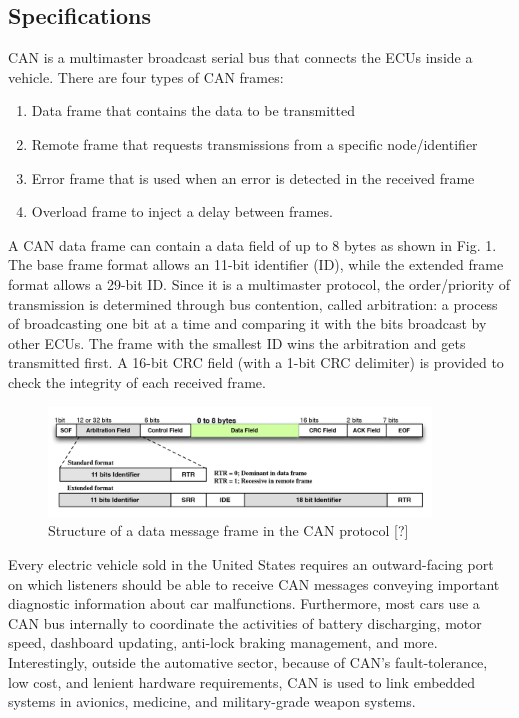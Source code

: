 \documentclass{article}
\begin{document}
  \subsection{Specifications}
    CAN  is  a  multimaster  broadcast  serial  bus  that  connects the  ECUs  inside  a  vehicle.   There  are  four  types  of  CAN frames:
  \begin{enumerate}
    \item Data frame that contains the data to be transmitted
    \item Remote frame that requests transmissions from a specific node/identifier
    \item Error frame that is used when an error is detected in the received frame
    \item Overload frame to inject a delay  between  frames.   
  \end{enumerate} 
    A  CAN  data  frame  can  contain  a data  field  of  up  to  8  bytes  as  shown  in    Fig.  1.   The  base frame format allows an 11-bit identifier (ID), while the extended frame format allows a 29-bit ID. Since it is a multimaster protocol, the order/priority of transmission is determined through bus contention, called arbitration:  a process of broadcasting one bit at a time and comparing it with the bits broadcast by other ECUs.  The frame with the smallest ID wins the arbitration and gets transmitted first.  A 16-bit CRC field (with a 1-bit CRC delimiter) is provided to check the integrity of each received frame.\\
    
\begin{figure}[h]
  \centering
  \includegraphics[width=4in]{frame}
  \caption {Structure of a data message frame in the CAN protocol [?]}
\end{figure}
    
    Every electric vehicle sold in the United States requires an outward-facing port on which listeners should be able to receive CAN messages conveying important diagnostic information about car malfunctions. Furthermore, most cars use a CAN bus internally to coordinate the activities of battery discharging, motor speed, dashboard updating, anti-lock braking management, and more. Interestingly, outside the automative sector, because of CAN's fault-tolerance, low cost, and lenient hardware requirements, CAN is used to link embedded systems in avionics, medicine, and military-grade weapon systems.\\
    
\end{document}
